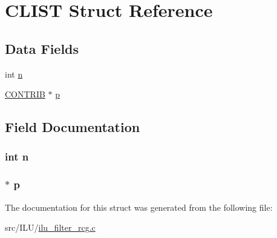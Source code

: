 \hypertarget{struct_c_l_i_s_t}{\section{C\-L\-I\-S\-T Struct Reference}
\label{struct_c_l_i_s_t}
}
\subsection*{Data Fields}
\begin{DoxyCompactItemize}
\item 
int \hyperlink{struct_c_l_i_s_t_a76f11d9a0a47b94f72c2d0e77fb32240}{n}
\item 
\hyperlink{struct_c_o_n_t_r_i_b}{C\-O\-N\-T\-R\-I\-B} $\ast$ \hyperlink{struct_c_l_i_s_t_a363f977c387565e3f5e95c69202bb07a}{p}
\end{DoxyCompactItemize}


\subsection{Field Documentation}
\hypertarget{struct_c_l_i_s_t_a76f11d9a0a47b94f72c2d0e77fb32240}{
\subsubsection[{n}]{\setlength{\rightskip}{0pt plus 5cm}int n}}\label{struct_c_l_i_s_t_a76f11d9a0a47b94f72c2d0e77fb32240}
\hypertarget{struct_c_l_i_s_t_a363f977c387565e3f5e95c69202bb07a}{
\subsubsection[{p}]{$\ast$ p}}\label{struct_c_l_i_s_t_a363f977c387565e3f5e95c69202bb07a}


The documentation for this struct was generated from the following file\-:\begin{DoxyCompactItemize}
\item 
src/\-I\-L\-U/\hyperlink{ilu__filter__rcg_8c}{ilu\-\_\-filter\-\_\-rcg.\-c}\end{DoxyCompactItemize}
